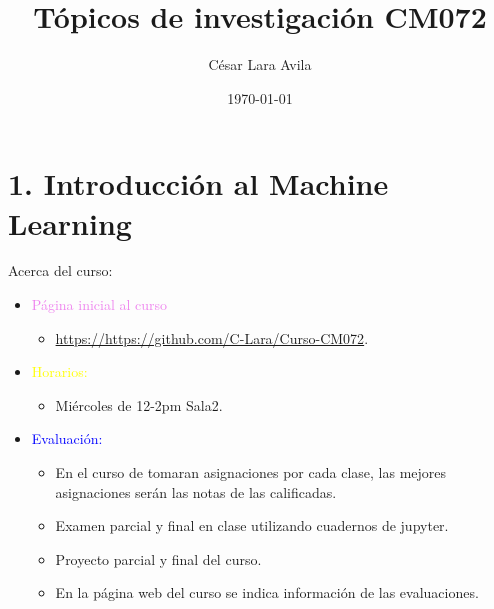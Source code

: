 \documentclass[11pt]{beamer}
\title{T\'opicos de investigaci\'on  CM072}
\date{\today}
\author{C\'esar Lara Avila}
\institute{\url{https://github.com/C-Lara}}
\begin{document}
  \maketitle
  \section{1. Introducci\'on al Machine Learning }
  
\begin{frame}{Acerca del curso:}
	

\begin{itemize}
	\item \textcolor{violet}{P\'agina inicial al curso}
	\begin{itemize}
		\item \url{https://https://github.com/C-Lara/Curso-CM072}.
	\end{itemize}
	\item \textcolor{yellow}{Horarios:}
	\begin{itemize}
		\item Mi\'ercoles de 12-2pm Sala2. 
	\end{itemize}
\item \textcolor{blue}{Evaluaci\'on:} 
\begin{itemize}
	\item En el curso de tomaran  asignaciones por cada clase, las mejores asignaciones ser\'an las notas de las calificadas.
	\item Examen parcial y final en clase utilizando cuadernos de jupyter.
	\item Proyecto parcial y final del curso. 
	\item En la p\'agina web del curso se indica informaci\'on de las evaluaciones.
\end{itemize}
\end{itemize}
\end{frame}
\end{document}
